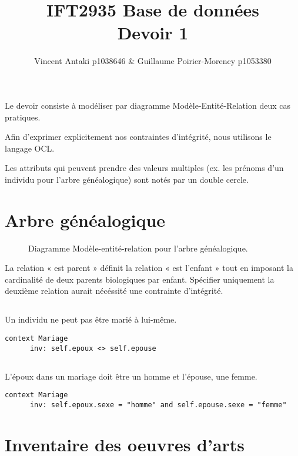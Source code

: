 \documentclass{article}
\title{IFT2935 Base de données \\ Devoir 1}
\author{Vincent Antaki p1038646 \& Guillaume Poirier-Morency p1053380}
\begin{document}
  \maketitle

  \abstract
  Le devoir consiste à modéliser par diagramme Modèle-Entité-Relation deux cas
  pratiques.

  Afin d'exprimer explicitement nos contraintes d'intégrité, nous utilisons le
  langage OCL.

  Les attributs qui peuvent prendre des valeurs multiples (ex. les prénoms d'un
  individu pour l'arbre généalogique) sont notés par un double cercle.

  \section{Arbre généalogique}

  \begin{sidewaysfigure}
  \begin{adjustbox}{max size={\textwidth}{\textheight}}
  
  \end{adjustbox}
  \caption{Diagramme Modèle-entité-relation pour l'arbre généalogique.}
  \end{sidewaysfigure}

  La relation « est parent » définit la relation « est l'enfant » tout en
  imposant la cardinalité de deux parents biologiques par enfant. Spécifier
  uniquement la deuxième relation aurait nécéssité une contrainte d'intégrité.

  \subsection{}
  Un individu ne peut pas être marié à lui-même.
  \begin{lstlisting}[language=OCL]
  context Mariage
      inv: self.epoux <> self.epouse
  \end{lstlisting}

  \subsection{}
  L'époux dans un mariage doit être un homme et l'épouse, une femme.
  \begin{lstlisting}[language=OCL]
  context Mariage
      inv: self.epoux.sexe = "homme" and self.epouse.sexe = "femme"
  \end{lstlisting}

  \section{Inventaire des oeuvres d'arts}
\end{document}
